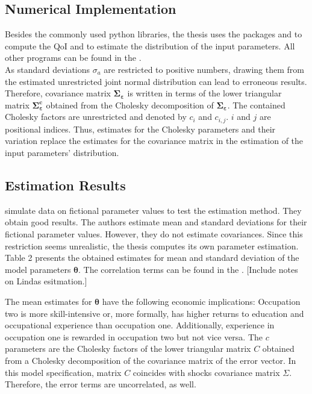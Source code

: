 \subsection{Numerical Implementation}

Besides the commonly used python libraries, the thesis uses the packages \textit{} and \textit{} to compute the QoI and to estimate the distribution of the input parameters. All other programs can be found in the  .\\

\noindent
As standard deviations $\sigma_{a}$ are restricted to positive numbers, drawing them from the estimated unrestricted joint normal distribution can lead to erroneous results. Therefore, covariance matrix $\pmb{\Sigma_\varepsilon}$ is written in terms of the lower triangular matrix $\pmb{\Sigma_\varepsilon^c}$ obtained from the Cholesky decomposition of $\pmb{\Sigma_\varepsilon}$. The contained Cholesky factors are unrestricted and denoted by $c_{i}$ and $c_{i,j}$. $i$ and $j$ are positional indices. Thus, estimates for the Cholesky parameters and their variation replace the estimates for the covariance matrix in the estimation of the input parameters' distribution.

\subsection{Estimation Results}
\cite{Keane.1994} simulate data on fictional parameter values to test the estimation method. They obtain good results. The authors estimate mean and standard deviations for their fictional parameter values. However, they do not estimate covariances. Since this restriction seems unrealistic, the thesis computes its own parameter estimation. Table 2 presents the obtained estimates for mean and standard deviation of the model parameters $\pmb{\theta}$. The correlation terms can be found in the .
[Include notes on Lindas esitmation.]

 The mean estimates for $\pmb{\theta}$ have the following economic implications: Occupation two is more skill-intensive or, more formally, has higher returns to education and occupational experience than occupation one. Additionally, experience in occupation one is rewarded in occupation two but not vice versa. The $c$ parameters are the Cholesky factors of the lower triangular matrix $C$ obtained from a Cholesky decomposition of the covariance matrix of the error vector. In this model specification, matrix $C$ coincides with shocks covariance matrix $\Sigma$. Therefore, the error terms are uncorrelated, as well.

